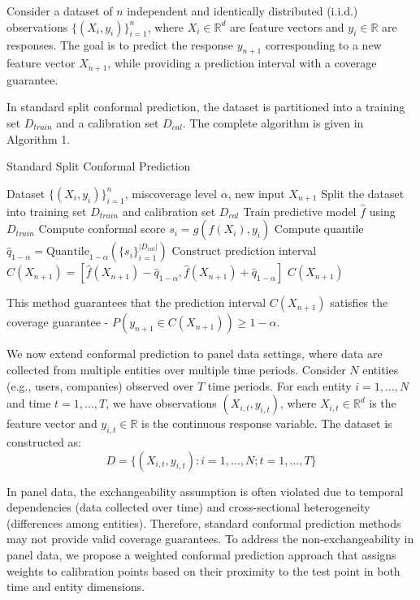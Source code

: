 Consider a dataset of $n$ independent and identically distributed (i.i.d.) observations $\{(X_i, y_i)\}_{i=1}^n$, where $X_i \in \mathbb{R}^d$ are feature vectors and $y_i \in \mathbb{R}$ are responses. The goal is to predict the response $y_{n+1}$ corresponding to a new feature vector $X_{n+1}$, while providing a prediction interval with a coverage guarantee.

In standard split conformal prediction, the dataset is partitioned into a training set $D_{train}$ and a calibration set $D_{cal}$. The complete algorithm is given in Algorithm 1.

\begin{algorithm}
\caption{Standard Split Conformal Prediction}
\begin{algorithmic}[1]
\Require Dataset $\{(X_i, y_i)\}_{i=1}^n$, miscoverage level $\alpha$, new input $X_{n+1}$
\State Split the dataset into training set $D_{train}$ and calibration set $D_{cal}$
\State Train predictive model $\hat{f}$ using $D_{train}$
    \State Compute conformal score $s_i = g(\hat{f}(X_i), y_i)$
\EndFor
\State Compute quantile $\hat{q}_{1-\alpha} = \text{Quantile}_{1-\alpha}(\{s_i\}_{i=1}^{|D_{cal}|})$
\State Construct prediction interval $C(X_{n+1}) = [\hat{f}(X_{n+1}) - \hat{q}_{1-\alpha}, \hat{f}(X_{n+1}) + \hat{q}_{1-\alpha}]$
\State \Return $C(X_{n+1})$
\end{algorithmic}
\end{algorithm}

This method guarantees that the prediction interval $C(X_{n+1})$ satisfies the coverage guarantee - $P(y_{n+1} \in C(X_{n+1})) \geq 1 - \alpha$.

We now extend conformal prediction to panel data settings, where data are collected from multiple entities over multiple time periods. Consider $N$ entities (e.g., users, companies) observed over $T$ time periods. For each entity $i = 1, \ldots, N$ and time $t = 1, \ldots, T$, we have observations $(X_{i,t}, y_{i,t})$, where $X_{i,t} \in \mathbb{R}^d$ is the feature vector and $y_{i,t} \in \mathbb{R}$ is the continuous response variable. The dataset is constructed as:
$$D = \{(X_{i,t}, y_{i,t}) : i = 1, \ldots, N; t = 1, \ldots, T\}$$

In panel data, the exchangeability assumption is often violated due to temporal dependencies (data collected over time) and cross-sectional heterogeneity (differences among entities). Therefore, standard conformal prediction methods may not provide valid coverage guarantees. To address the non-exchangeability in panel data, we propose a weighted conformal prediction \cite{barber2022conformal, oliveira2022split} approach that assigns weights to calibration points based on their proximity to the test point in both time and entity dimensions.

